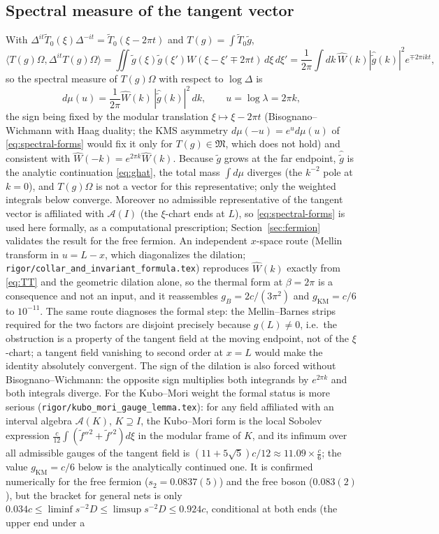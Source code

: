 \documentclass[11pt]{article}
\theoremstyle{accent}
\theoremstyle{definition}
\newcommand{\cA}{\mathcal{A}}
\newcommand{\cM}{\mathfrak{M}}
\newcommand{\Wh}{\widehat W}
\newcommand{\gh}{\widehat{\widetilde g}}
\newcommand{\gt}{\widetilde g}
\begin{document}
\subsection{Spectral measure of the tangent vector}
With \(\Delta^{it}\widetilde T_0(\xi)\Delta^{-it}=\widetilde T_0(\xi-2\pi t)\) and \(T(g)=\int\widetilde T_0\gt\),
\[
 \langle T(g)\Omega,\Delta^{it}T(g)\Omega\rangle=\iint\gt(\xi)\gt(\xi')W(\xi-\xi'\mp2\pi t)\,d\xi\,d\xi'
 =\frac1{2\pi}\int dk\,\Wh(k)|\gh(k)|^2e^{\mp2\pi ikt},
\]
so the spectral measure of \(T(g)\Omega\) with respect to \(\log\Delta\) is
\begin{equation}\label{eq:mu}
 d\mu(u)=\frac1{2\pi}\Wh(k)\,|\gh(k)|^2\,dk,\qquad u=\log\lambda=2\pi k,
\end{equation}
the sign being fixed by the modular translation \(\xi\mapsto\xi-2\pi t\) (Bisognano--Wichmann with Haag duality; the KMS asymmetry \(d\mu(-u)=e^ud\mu(u)\) of \eqref{eq:spectral-forms} would fix it only for \(T(g)\in\cM\), which does not hold) and consistent with \(\Wh(-k)=e^{2\pi k}\Wh(k)\).  Because \(\gt\) grows at the far endpoint, \(\gh\) is the analytic continuation \eqref{eq:ghat}, the total mass \(\int d\mu\) diverges (the \(k^{-2}\) pole at \(k=0\)), and \(T(g)\Omega\) is not a vector for this representative; only the weighted integrals below converge.  Moreover no admissible representative of the tangent vector is affiliated with \(\cA(I)\) (the \(\xi\)-chart ends at \(L\)), so \eqref{eq:spectral-forms} is used here formally, as a computational prescription; Section~\ref{sec:fermion} validates the result for the free fermion.  An independent \(x\)-space route (Mellin transform in \(u=L-x\), which diagonalizes the dilation; \texttt{rigor/collar\_and\_invariant\_formula.tex}) reproduces \(\Wh(k)\) exactly from \eqref{eq:TT} and the geometric dilation alone, so the thermal form at \(\beta=2\pi\) is a consequence and not an input, and it reassembles \(g_B=2c/(3\pi^2)\) and \(g_{\mathrm{KM}}=c/6\) to \(10^{-11}\).  The same route diagnoses the formal step: the Mellin--Barnes strips required for the two factors are disjoint precisely because \(g(L)\ne0\), i.e.\ the obstruction is a property of the tangent field at the moving endpoint, not of the \(\xi\)-chart; a tangent field vanishing to second order at \(x=L\) would make the identity absolutely convergent.  The sign of the dilation is also forced without Bisognano--Wichmann: the opposite sign multiplies both integrands by \(e^{2\pi k}\) and both integrals diverge.  For the Kubo--Mori weight the formal status is more serious (\texttt{rigor/kubo\_mori\_gauge\_lemma.tex}): for any field affiliated with an interval algebra \(\cA(K)\), \(K\supseteq I\), the Kubo--Mori form is the local Sobolev expression \(\frac c{12}\int(\tilde f''^2+\tilde f'^2)d\xi\) in the modular frame of \(K\), and its infimum over all admissible gauges of the tangent field is \((11+5\sqrt5)c/12\approx11.09\times\frac c6\); the value \(g_{\mathrm{KM}}=c/6\) below is the analytically continued one.  It is confirmed numerically for the free fermion (\(s_2=0.0837(5)\)) and the free boson (\(0.083(2)\)), but the bracket for general nets is only \(0.034c\le\liminf s^{-2}D\le\limsup s^{-2}D\le0.924c\), conditional at both ends (the upper end under a 
\end{document}
